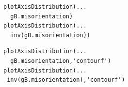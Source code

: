\documentclass[compress]{beamer}
\begin{document}
\begin{frame}[fragile]
\begin{columns}
\begin{column}{0.67\textwidth}
\begin{overlayarea}{\textwidth}{\textheight}
\pause
\begin{lstlisting}[style=input]
plotAxisDistribution(...
  gB.misorientation)
plotAxisDistribution(...
  inv(gB.misorientation))
\end{lstlisting}

\pause
\begin{lstlisting}[style=input]
plotAxisDistribution(...
  gB.misorientation,'contourf')
plotAxisDistribution(...
 inv(gB.misorientation),'contourf')
\end{lstlisting}
\end{overlayarea}
\end{column}
\begin{column}{0.33\textwidth}

  \begin{overlayarea}{\textwidth}{\textheight}


\end{overlayarea}
\end{column}
\end{columns}
\end{frame}
\end{document}

